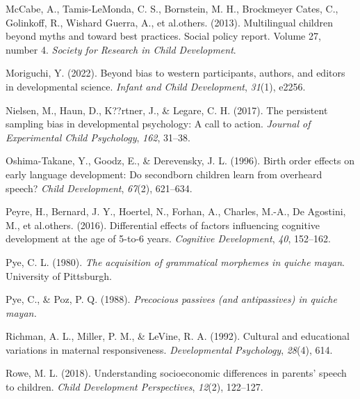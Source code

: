 \documentclass[
  man,floatsintext]{apa6}
\newlength{\cslhangindent}
\newlength{\cslentryspacingunit} %
\newenvironment{CSLReferences}[2] %
 {%
  \setlength{\parindent}{0pt}
  \ifodd #1
  \let\oldpar\par
  \def\par{\hangindent=\cslhangindent\oldpar}
  \fi
  \setlength{\parskip}{#2\cslentryspacingunit}
 }%
 {}
\begin{document}
\begin{CSLReferences}{1}{0}
\leavevmode{}%
McCabe, A., Tamis-LeMonda, C. S., Bornstein, M. H., Brockmeyer Cates, C., Golinkoff, R., Wishard Guerra, A., et al.others. (2013). Multilingual children beyond myths and toward best practices. Social policy report. Volume 27, number 4. \emph{Society for Research in Child Development}.

\leavevmode{}%
Moriguchi, Y. (2022). Beyond bias to western participants, authors, and editors in developmental science. \emph{Infant and Child Development}, \emph{31}(1), e2256.

\leavevmode{}%
Nielsen, M., Haun, D., K??rtner, J., \& Legare, C. H. (2017). The persistent sampling bias in developmental psychology: A call to action. \emph{Journal of Experimental Child Psychology}, \emph{162}, 31--38.

\leavevmode{}%
Oshima-Takane, Y., Goodz, E., \& Derevensky, J. L. (1996). Birth order effects on early language development: Do secondborn children learn from overheard speech? \emph{Child Development}, \emph{67}(2), 621--634.

\leavevmode{}%
Peyre, H., Bernard, J. Y., Hoertel, N., Forhan, A., Charles, M.-A., De Agostini, M., et al.others. (2016). Differential effects of factors influencing cognitive development at the age of 5-to-6 years. \emph{Cognitive Development}, \emph{40}, 152--162.

\leavevmode{}%
Pye, C. L. (1980). \emph{The acquisition of grammatical morphemes in quiche mayan}. University of Pittsburgh.

\leavevmode{}%
Pye, C., \& Poz, P. Q. (1988). \emph{Precocious passives (and antipassives) in quiche mayan.}

\leavevmode{}%
Richman, A. L., Miller, P. M., \& LeVine, R. A. (1992). Cultural and educational variations in maternal responsiveness. \emph{Developmental Psychology}, \emph{28}(4), 614.

\leavevmode{}%
Rowe, M. L. (2018). Understanding socioeconomic differences in parents' speech to children. \emph{Child Development Perspectives}, \emph{12}(2), 122--127.


\end{CSLReferences}
\end{document}
